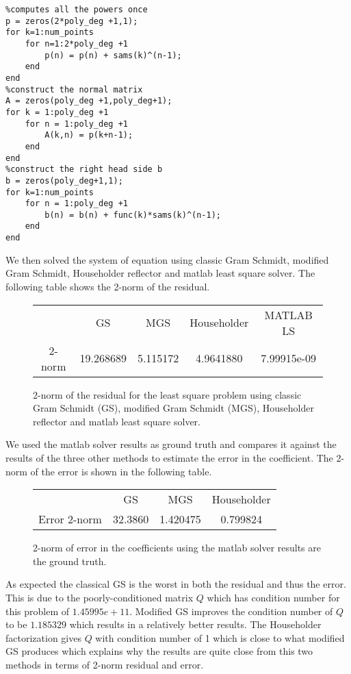 \begin{lstlisting}
%computes all the powers once
p = zeros(2*poly_deg +1,1);
for k=1:num_points
    for n=1:2*poly_deg +1
        p(n) = p(n) + sams(k)^(n-1);
    end
end
%construct the normal matrix
A = zeros(poly_deg +1,poly_deg+1);
for k = 1:poly_deg +1
    for n = 1:poly_deg +1
        A(k,n) = p(k+n-1);
    end
end
%construct the right head side b
b = zeros(poly_deg+1,1);
for k=1:num_points
    for n = 1:poly_deg +1
        b(n) = b(n) + func(k)*sams(k)^(n-1);
    end
end
\end{lstlisting}
We then solved the system of equation using classic Gram Schmidt, modified Gram Schmidt, Householder reflector and matlab least square solver. 
The following table shows the 2-norm of the residual. 
\begin{figure}[H]
 \centering
\begin{tabular}{ |c || c|c || c|c |}
 \hline
  &GS & MGS & Householder & MATLAB LS \\ 
  	
  \hhline{|=|=|=|=|=|}                           
 2-norm &19.268689 &5.115172	&4.9641880 & 7.99915e-09	 \\                                                                  
 \hline
\end{tabular} 
  \caption{2-norm of the residual for the least square problem using classic Gram Schmidt (GS), modified Gram Schmidt (MGS), Householder reflector and matlab least square solver.}
   \label{tab:part_b}
\end{figure} 

We used the matlab solver results as ground truth and compares it against the results of the three other methods to estimate the error in the coefficient. The 2-norm of the error is shown in the following table. 

\begin{figure}[H]
 \centering
\begin{tabular}{ |c || c|c || c |}
 \hline
  &GS & MGS & Householder  \\ 
  	
  \hhline{|=|=|=|=|}                           
Error 2-norm & 32.3860 & 1.420475	& 0.799824	 \\                                                                  
 \hline
\end{tabular} 
  \caption{2-norm of error in the coefficients using the matlab solver results are the ground truth.}
   \label{tab:part_c}
\end{figure} 

As expected the classical GS is the worst in both the residual and thus the error. This is due to the poorly-conditioned matrix $Q$ which has condition number for this problem of $1.45995e+11$. Modified GS improves the condition number of $Q$ to be $1.185329$ which results in a relatively better results. The Householder factorization gives $Q$ with condition number of 1 which is close to what modified GS produces which explains why the results are quite close from this two methods in terms of 2-norm residual and error. 






